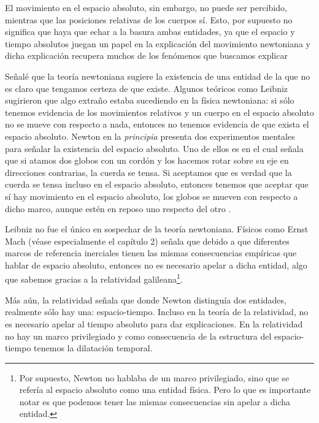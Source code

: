 \documentclass{article}
\begin{document}
El movimiento en el espacio absoluto, sin embargo, no puede ser percibido, mientras que las posiciones relativas de los cuerpos sí. Esto, por supuesto no significa que haya que echar a la basura ambas entidades, ya que el espacio y tiempo absolutos juegan un papel en la explicación del movimiento newtoniana y dicha explicación recupera muchos de los fenómenos que buscamos explicar 

Señalé que la teoría newtoniana sugiere la existencia de una entidad de la que no es claro que tengamos certeza de que existe. Algunos teóricos como Leibniz sugirieron que algo extraño estaba sucediendo en la física newtoniana: si sólo tenemos evidencia de los movimientos relativos y un cuerpo en el espacio absoluto no se mueve con respecto a nada, entonces no tenemos evidencia de que exista el espacio absoluto. Newton en la \textit{principia} presenta dos experimentos mentales para señalar la existencia del espacio absoluto. Uno de ellos es en el cual señala que si atamos dos globos con un cordón y los hacemos rotar sobre su eje en direcciones contrarias, la cuerda se tensa. Si aceptamos que es verdad que la cuerda se tensa incluso en el espacio absoluto, entonces tenemos que aceptar que sí hay movimiento en el espacio absoluto, los globos se mueven con respecto a dicho marco, aunque estén en reposo uno respecto del otro \cite[pp. 6-12]{book:360820}.

Leibniz no fue el único en sospechar de la teoría newtoniana. Físicos como Ernst Mach (véase especialmente el capítulo 2) \citeyear{Mach2013} señala que debido a que diferentes marcos de referencia inerciales tienen las mismas consecuencias empíricas que hablar de espacio absoluto, entonces no es necesario apelar a dicha entidad, algo que sabemos gracias a la relatividad galileana\footnote{Por supuesto, Newton no hablaba de un marco privilegiado, sino que se refería al espacio absoluto como una entidad física. Pero lo que es importante notar es que podemos tener las mismas consecuencias sin apelar a dicha entidad.}.

Más aún, la relatividad señala que donde Newton distinguía dos entidades, realmente sólo hay una: espacio-tiempo. Incluso en la teoría de la relatividad, no es necesario apelar al tiempo absoluto para dar explicaciones. En la relatividad no hay un marco privilegiado y como consecuencia de la estructura del espacio-tiempo tenemos la dilatación temporal.
\end{document}
